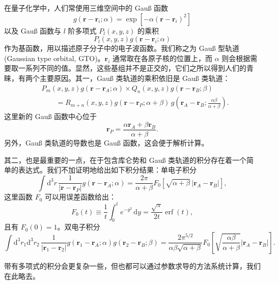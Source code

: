 在量子化学中，人们常使用三维空间中的 Gauß 函数
\begin{equation}
g(\bm r-\bm r_i;\alpha)=\exp[-\alpha(\bm r-\bm r_i)^2]
\tag{5.4.37}
\end{equation}
以及 Gauß 函数与 $l$ 阶多项式 $P_l(x,y,z)$ 的乘积
\begin{equation}
P_l(x,y,z)g(\bm r-\bm r_i;\alpha)
\tag{5.4.38}
\end{equation}
作为基函数，用以描述原子分子中的电子波函数。我们称之为 Gauß 型轨道 (Gaussian type orbital, GTO)。$\bm r_i$ 通常取在各原子核的位置上，而 $\alpha$ 则会根据需要取一系列不同的值。显然，这些基组并不是正交的，它们之所以得到人们的青睐，有两个主要原因。其一，Gauß 类轨道的乘积依旧是 Gauß 类轨道：
\begin{equation}
\begin{aligned}
&P_m(x,y,z)g(\bm r-\bm r_A;\alpha)\times Q_n(x,y,z)g(\bm r-\bm r_B;\beta)\\
&\qquad=R_{m+n}(x,y,z)g(\bm r-\bm r_P;\alpha+\beta)
\,g\!\left(\bm r_A-\bm r_B;\frac{\alpha\beta}{\alpha+\beta}\right).
\end{aligned}
\tag{5.4.39}
\end{equation}
这里新的 Gauß 函数中心位于
\begin{equation}
\bm r_P=\frac{\alpha\bm r_A+\beta\bm r_B}{\alpha+\beta}.
\tag{5.4.40}
\end{equation}
另外，Gauß 类轨道的导数也是 Gauß 函数，这会便于解析计算。

其二，也是最重要的一点，在于包含库仑势和 Gauß 类轨道的积分存在着一个简单的表达式。我们不加证明地给出如下积分结果：单电子积分
\begin{equation}
\int \mathrm d^3r\,\frac1{|\bm r-\bm r_P|}g(\bm r-\bm r_A;\alpha)
=\frac{2\pi}{\alpha+\beta}F_0\!\left[\sqrt{\alpha+\beta}\,|\bm r_A-\bm r_B|\right],
\tag{5.4.41}
\end{equation}
这里函数 $F_0$ 可以用误差函数给出：
\begin{equation}
F_0(t)\equiv\frac1t\int_0^t e^{-y^2}\,\mathrm dy=\frac{\sqrt\pi}{2t}\operatorname{erf}(t),
\tag{5.4.42}
\end{equation}
且有 $F_0(0)=1$。双电子积分
\begin{equation}
\int \mathrm d^3r_1\mathrm d^3r_2\,\frac1{|\bm r_1-\bm r_2|}
 g(\bm r_1-\bm r_A;\alpha)g(\bm r_2-\bm r_B;\beta)
=\frac{2\pi^{5/2}}{\alpha\beta\sqrt{\alpha+\beta}}
F_0\!\left[\sqrt{\frac{\alpha\beta}{\alpha+\beta}}|\bm r_A-\bm r_B|\right].
\tag{5.4.43}
\end{equation}

带有多项式的积分会更复杂一些，但也都可以通过参数求导的方法系统计算，我们在此略去。

